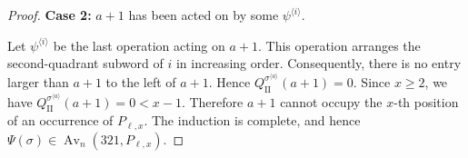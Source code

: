 \documentclass[10pt,a4paper]{amsart}
\begin{document}
\begin{proof}
\noindent \textbf{Case 2:} $a+1$ has been acted on by some
$\psi^{\langle i\rangle}$.

Let $\psi^{\langle i\rangle}$ be the last operation acting on $a+1$.
This operation arranges the second-quadrant subword of $i$ in
increasing order. Consequently, there is no entry larger than $a+1$
to the left of $a+1$. Hence
$Q_{\mathrm{II}}^{\sigma^{\langle a\rangle}}(a+1)=0$.
Since $x\geq2$, we have
$Q_{\mathrm{II}}^{\sigma^{\langle a\rangle}}(a+1)
=0<x-1$.
Therefore $a+1$ cannot occupy the $x$-th position of an occurrence of
$P_{\ell,x}$.
The induction is complete, and hence
$\Psi(\sigma)\in\operatorname{Av}_n(321,P_{\ell,x})$.
\end{proof}
\end{document}
